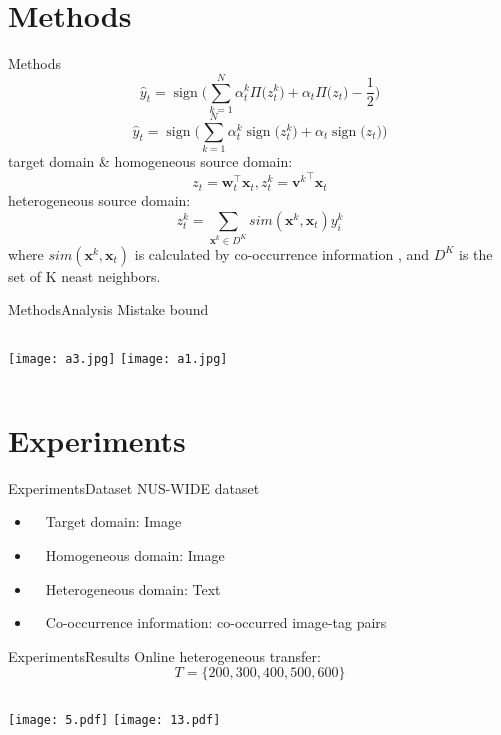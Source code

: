 \documentclass{beamer}
\newcommand{\sign}{\operatorname{sign}}
\newcommand{\sign}{\operatorname{sign}}
\begin{document}
\section{Methods}
\begin{frame}{Methods}{}
$$ \hat{y}_t = \sign \Bigg( \sum_{k=1}^{N} \alpha_{t}^{k} \Pi \Big( z_{t}^{k} \Big) + \alpha_t \Pi \Big( z_t \Big) - \frac{1}{2} \Bigg) $$
$$ \hat{y}_t = \sign \Bigg( \sum_{k=1}^{N} \alpha_{t}^{k} \sign \Big( z_{t}^{k} \Big) + \alpha_t \sign \Big( z_t \Big)  \Bigg) $$
target domain \& homogeneous source domain: \\
$$ z_t = \mathbf{w}_{t}^{\top} \mathbf{x}_t, z_{t}^{k} = {\mathbf{v}^{k}}^{\top} \mathbf{x}_t $$
heterogeneous source domain: \\
$$ z_{t}^{k} = \sum\limits_{\mathbf{x}^{k} \in D^K} sim(\mathbf{x}^{k}, \mathbf{x}_{t}) y_{i}^{k} $$
where $sim(\mathbf{x}^{k},\mathbf{x}_{t})$ is calculated by co-occurrence information \cite{ng2012co}, and $D^K$ is the set of K neast neighbors.
\end{frame}

\begin{frame}{Methods}{Analysis}
Mistake bound
\begin{columns}
\texttt{[image: a3.jpg]}
\texttt{[image: a1.jpg]}
\end{columns}
\end{frame}

\section{Experiments}
\begin{frame}{Experiments}{Dataset}
NUS-WIDE dataset \\
\begin{itemize}
\item
~~Target domain: Image 
\item
~~Homogeneous domain: Image
\item
~~Heterogeneous domain: Text
\item
~~Co-occurrence information: co-occurred image-tag pairs
\end{itemize}
\end{frame}

\begin{frame}{Experiments}{Results}
Online heterogeneous transfer:
$$T = \{200,300,400,500,600 \}$$
\begin{columns}
\texttt{[image: 5.pdf]}
\texttt{[image: 13.pdf]}
\end{columns}
\end{frame}
\end{document}
